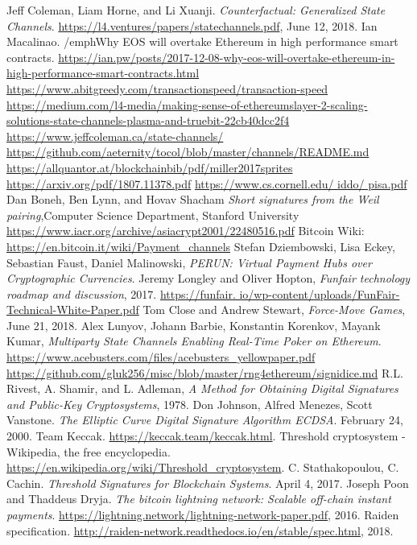 \documentclass[tikz, 12pt]{article}
\theoremstyle{definition}
\theoremstyle{remark}
\begin{document}

	\begin{thebibliography}{9}
Jeff Coleman, Liam Horne, and Li Xuanji. \emph{Counterfactual: Generalized State Channels}. \url{https://l4.ventures/papers/statechannels.pdf}, June 12, 2018.
 Ian Macalinao. /emph{Why EOS will overtake Ethereum in high performance smart contracts}. \url{https://ian.pw/posts/2017-12-08-why-eos-will-overtake-ethereum-in-high-performance-smart-contracts.html}
 \url{https://www.abitgreedy.com/transactionspeed/transaction-speed}
 \url{https://medium.com/l4-media/making-sense-of-ethereumslayer-2-scaling-solutions-state-channels-plasma-and-truebit-22cb40dcc2f4}
 \url{https://www.jeffcoleman.ca/state-channels/}
 \url{https://github.com/aeternity/tocol/blob/master/channels/README.md}
 \url{https://allquantor.at/blockchainbib/pdf/miller2017sprites}
 \url{https://arxiv.org/pdf/1807.11378.pdf}
 \url{https://www.cs.cornell.edu/ iddo/ pisa.pdf}
Dan Boneh, Ben Lynn, and Hovav Shacham \emph{Short signatures from the Weil pairing},Computer Science Department, Stanford University \url{https://www.iacr.org/archive/asiacrypt2001/22480516.pdf}
 Bitcoin Wiki: \url{https://en.bitcoin.it/wiki/Payment_channels}
 Stefan Dziembowski, Lisa Eckey, Sebastian Faust, Daniel Malinowski, \emph{PERUN: Virtual Payment Hubs over Cryptographic Currencies}.
 Jeremy Longley and Oliver Hopton, \emph{Funfair technology roadmap and discussion}, 2017. \url{https://funfair.
io/wp-content/uploads/FunFair-Technical-White-Paper.pdf}
 Tom Close and Andrew Stewart, \emph{Force-Move Games}, June 21, 2018.
 Alex Lunyov, Johann Barbie, Konstantin Korenkov, Mayank Kumar, \emph{Multiparty State Channels
Enabling Real-Time Poker on Ethereum}. \url{https://www.acebusters.com/files/acebusters_yellowpaper.pdf}
 \url{https://github.com/gluk256/misc/blob/master/rng4ethereum/signidice.md}
 R.L. Rivest, A. Shamir, and L. Adleman, \emph{A Method for Obtaining Digital Signatures and Public-Key Cryptosystems}, 1978.
 Don Johnson, Alfred Menezes, Scott Vanstone. \emph{The Elliptic Curve Digital Signature Algorithm ECDSA}. February 24, 2000.
 Team Keccak. \url{https://keccak.team/keccak.html}.
 Threshold cryptosystem - Wikipedia, the free encyclopedia. \url{https://en.wikipedia.org/wiki/Threshold_cryptosystem}.
 C. Stathakopoulou, C. Cachin. \emph{Threshold Signatures for Blockchain Systems}. April 4, 2017. 
 Joseph Poon and Thaddeus Dryja. \emph{The bitcoin lightning network: Scalable off-chain instant payments}. \url{https://lightning.network/lightning-network-paper.pdf}, 2016.
 Raiden specification. \url{http://raiden-network.readthedocs.io/en/stable/spec.html}, 2018.
\end{thebibliography}


		
\end{document}
